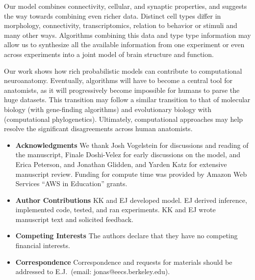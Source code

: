 \documentclass{article}
\begin{document}
Our model combines connectivity, cellular, and synaptic properties,
and suggests the way towards combining even richer data. Distinct cell
types differ in morphology, connectivity, transcriptomics, relation to
behavior or stimuli and many other ways. Algorithms combining this
data and type type information may allow us to synthesize all the
available information from one experiment or even across experiments
into a joint model of brain structure and function.

Our work shows how rich probabilistic models can contribute to computational neuroanatomy. 
Eventually, algorithms will have to become a central tool for
anatomists, as it will progressively become impossible for humans to
parse the huge datasets. This transition may follow a similar
transition to that of molecular biology (with gene-finding
algorithms) and evolutionary biology with (computational
phylogenetics). Ultimately, computational approaches may help resolve the significant
disagreements across human anatomists. 



\printbibliography
\newpage

\begin{itemize}

 \item \textbf{Acknowledgments} We thank Josh Vogelstein for discussions and reading of the manuscript, Finale Doshi-Velez for early discussions on the model, and Erica Peterson, and Jonathan Glidden, and Yarden Katz for extensive manuscript review. Funding for compute time was provided by Amazon Web Services ``AWS in Education'' grants. 
\item \textbf{Author Contributions} KK and EJ developed model. EJ derived inference, implemented code, tested, and ran experiments. KK and EJ wrote manuscript text and solicited feedback. 
 \item \textbf{Competing Interests} The authors declare that they have no
competing financial interests.
 \item \textbf{Correspondence} Correspondence and requests for materials
should be addressed to E.J.~(email: jonas@eecs.berkeley.edu).
\end{itemize}
\end{document}
